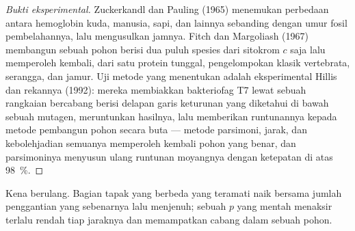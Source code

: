 \begin{proof}[Bukti eksperimental]
Zuckerkandl dan Pauling (1965) menemukan perbedaan antara hemoglobin
kuda, manusia, sapi, dan lainnya sebanding dengan umur fosil
pembelahannya, lalu mengusulkan jamnya. Fitch dan Margoliash (1967)
membangun sebuah pohon berisi dua puluh spesies dari sitokrom $c$ saja
lalu memperoleh kembali, dari satu protein tunggal, pengelompokan
klasik vertebrata, serangga, dan jamur. Uji metode yang menentukan
adalah  eksperimental Hillis dan rekannya (1992): mereka
membiakkan bakteriofag T7 lewat sebuah rangkaian bercabang berisi
delapan garis keturunan yang diketahui di bawah sebuah mutagen,
meruntunkan hasilnya, lalu memberikan runtunannya kepada metode
pembangun pohon secara buta --- metode parsimoni, jarak, dan
kebolehjadian semuanya memperoleh kembali pohon yang benar, dan
parsimoninya menyusun ulang runtunan moyangnya dengan ketepatan di
atas \qty{98}{\%}.
\end{proof}

\begin{omfigure}

{\small Kena berulang. Bagian tapak yang berbeda yang teramati naik
bersama jumlah penggantian yang sebenarnya lalu menjenuh; sebuah $p$
yang mentah menaksir terlalu rendah tiap jaraknya dan memampatkan
cabang dalam sebuah pohon.}
\end{omfigure}

